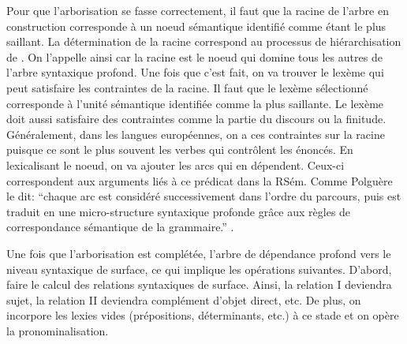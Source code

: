 Pour que l'arborisation se fasse correctement, il faut que la racine de l'arbre en construction corresponde à un noeud sémantique identifié comme étant le plus saillant. La détermination de la racine correspond au processus de hiérarchisation de \cite{PolguereStructurationmisejeu1990}. On l'appelle ainsi car la racine est le noeud qui domine tous les autres de l'arbre syntaxique profond. Une fois que c'est fait, on va trouver le lexème qui peut satisfaire les contraintes de la racine. Il faut que le lexème sélectionné corresponde à l'unité sémantique identifiée comme la plus saillante. Le lexème doit aussi satisfaire des contraintes comme la partie du discours ou la finitude. Généralement, dans les langues européennes, on a ces contraintes sur la racine puisque ce sont le plus souvent les verbes qui contrôlent les énoncés. En lexicalisant le noeud, on va  ajouter les arcs qui en dépendent. Ceux-ci correspondent aux arguments liés à ce prédicat dans la RSém. Comme Polguère le dit: ``chaque arc est considéré successivement dans l'ordre du parcours, puis est traduit en une micro-structure syntaxique profonde grâce aux règles de correspondance sémantique de la grammaire.'' \citep[p.~273]{PolguereStructurationmisejeu1990}.

Une fois que l'arborisation est complétée, l'arbre de dépendance profond  vers le niveau syntaxique de surface, ce qui implique les opérations suivantes. D'abord, faire le calcul des relations syntaxiques de surface. Ainsi, la relation I deviendra sujet, la relation II deviendra complément d'objet direct, etc. De plus, on incorpore les lexies vides (prépositions, déterminants, etc.) à ce stade et on opère la pronominalisation.


